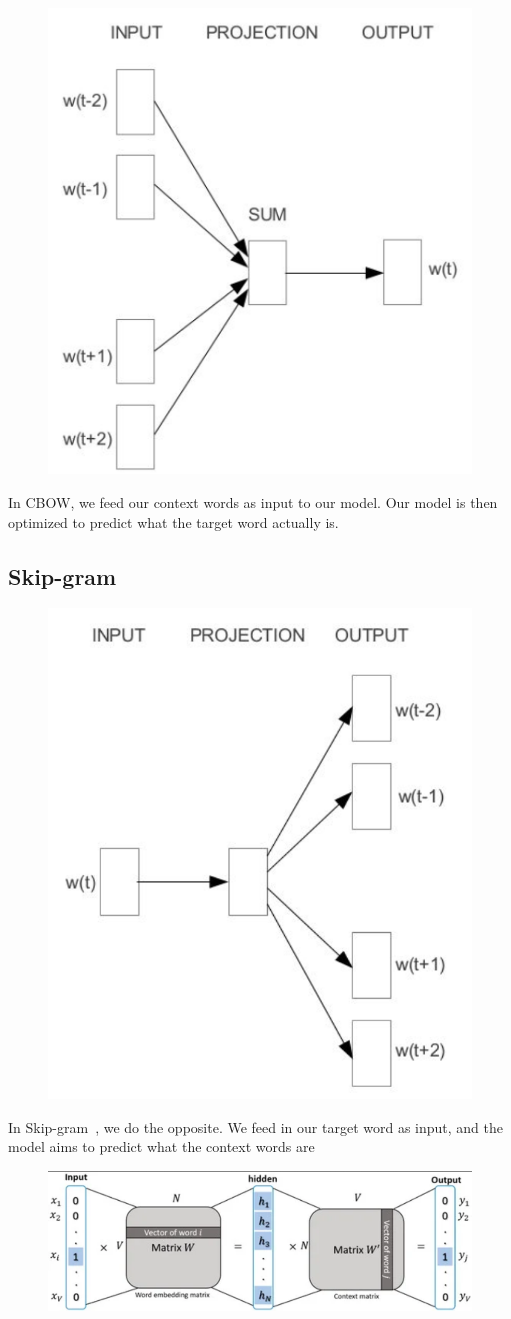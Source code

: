 \documentclass[11pt]{article}
\begin{document}
\begin{figure}[H]
    \centering
    \includegraphics[width=.3\linewidth]{figures/CBOW.png}
\end{figure}

In CBOW, we feed our context words as input to our model. Our model is then optimized to predict what the target word actually is.

\subsection{Skip-gram}

\begin{figure}[H]
    \centering
    \includegraphics[width=.3\linewidth]{figures/SkipGram.png}
\end{figure}

In Skip-gram~\cite{WordSenseDisambiguation,CBOW-and-skipgram}, we do the opposite. We feed in our target word as input, and the model aims to predict what the context words are

\begin{figure}[H]
    \centering
    \includegraphics[trim={0 0 0 5px}, clip, width=\linewidth]{figures/SkipGramDetailed.png}
\end{figure}
\end{document}
